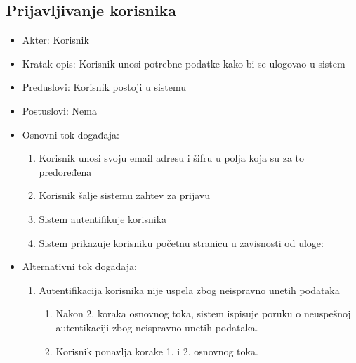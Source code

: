 \documentclass[a4paper]{article}
\begin{document}
\subsection{Prijavljivanje korisnika}
\begin{itemize}
    \item Akter: Korisnik
    \item Kratak opis: Korisnik unosi potrebne podatke kako bi se ulogovao u sistem
    \item Preduslovi: Korisnik postoji u sistemu
    \item Postuslovi: Nema
    \item Osnovni tok događaja:
        \begin{enumerate}
            \item Korisnik unosi svoju email adresu i šifru u polja koja su za to predoređena
            \item Korisnik šalje sistemu zahtev za prijavu
            \item Sistem autentifikuje korisnika
            \item Sistem prikazuje korisniku početnu stranicu u zavisnosti od uloge:
        \end{enumerate}
    \item Alternativni tok događaja:
        \begin{enumerate}
            \item Autentifikacija korisnika nije uspela zbog neispravno unetih podataka
                \begin{enumerate}
                    \item Nakon 2. koraka osnovnog toka, sistem ispisuje poruku o neuspešnoj autentikaciji zbog neispravno unetih podataka.
                    \item Korisnik ponavlja korake 1. i 2. osnovnog toka.

\end{enumerate}
\end{enumerate}
\end{itemize}
\end{document}
